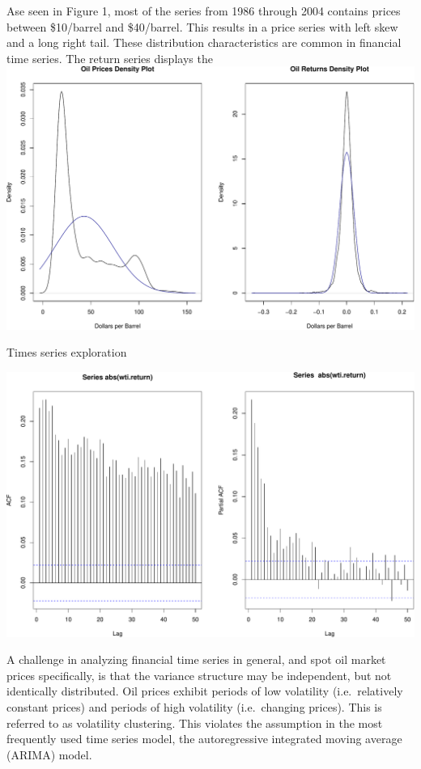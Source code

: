 \documentclass[11pt,]{article}
\makeatletter
\def\maxwidth{\ifdim\Gin@nat@width>\linewidth\linewidth
\else\Gin@nat@width\fi}
\let\Oldincludegraphics\includegraphics
\renewcommand{\includegraphics}[1]{\Oldincludegraphics[width=\maxwidth]{#1}}
\makeatother
\begin{document}
Ase seen in Figure 1, most of the series from 1986 through 2004 contains
prices between \$10/barrel and \$40/barrel. This results in a price
series with left skew and a long right tail. These distribution
characteristics are common in financial time series. The return series
displays the \includegraphics{Figs/unnamed-chunk-5-1.pdf}

Times series exploration

\includegraphics{Figs/unnamed-chunk-6-1.pdf}

A challenge in analyzing financial time series in general, and spot oil
market prices specifically, is that the variance structure may be
independent, but not identically distributed. Oil prices exhibit periods
of low volatility (i.e.~relatively constant prices) and periods of high
volatility (i.e.~changing prices). This is referred to as volatility
clustering. This violates the assumption in the most frequently used
time series model, the autoregressive integrated moving average (ARIMA)
model.
\end{document}
